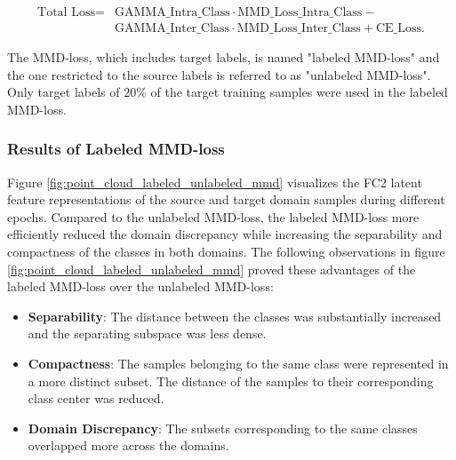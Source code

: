 \begin{equation}
\begin{split}
    \mbox{Total Loss} = & \mbox{GAMMA\_Intra\_Class}  \cdot \mbox{MMD\_Loss\_Intra\_Class} - \\
                              &\mbox{GAMMA\_Inter\_Class} \cdot \mbox{MMD\_Loss\_Inter\_Class} + \mbox{CE\_Loss}.
\end{split}
\end{equation}

The MMD-loss, which includes target labels, is named "labeled MMD-loss" and the one restricted to the source labels is referred to as "unlabeled MMD-loss". Only target labels of 20\% of the target training samples were used in the labeled MMD-loss.

\subsubsection{Results of Labeled MMD-loss}
Figure \ref{fig:point_cloud_labeled_unlabeled_mmd}
visualizes the FC2 latent feature representations of the source and target domain samples during different epochs. Compared to the unlabeled MMD-loss, the labeled MMD-loss more efficiently reduced the domain discrepancy while increasing the separability and compactness of the classes in both domains. The following observations in figure \ref{fig:point_cloud_labeled_unlabeled_mmd} proved these advantages of the labeled MMD-loss over the unlabeled MMD-loss:
\begin{itemize}
    \item \textbf{Separability}: The distance between the classes was substantially increased and the separating subspace was less dense.
    \item \textbf{Compactness}: The samples belonging to the same class were represented in a more distinct subset. The distance of the samples to their corresponding class center was reduced. 
    \item \textbf{Domain Discrepancy}: The subsets corresponding to the same classes overlapped more across the domains.
\end{itemize}
